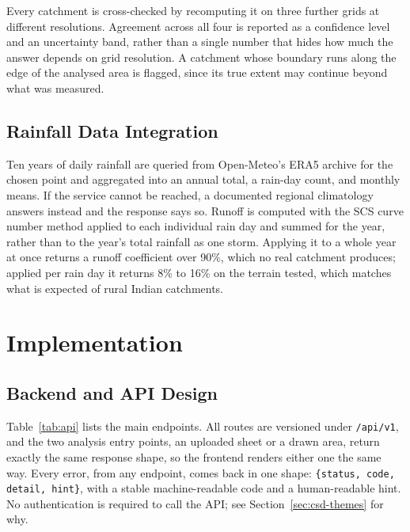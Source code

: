 \documentclass[manuscript,screen,review]{acmart}
\begin{document}
Every catchment is cross-checked by recomputing it on three further grids at different
resolutions. Agreement across all four is reported as a confidence level and an
uncertainty band, rather than a single number that hides how much the answer depends on
grid resolution. A catchment whose boundary runs along the edge of the analysed area is
flagged, since its true extent may continue beyond what was measured.

\subsection{Rainfall Data Integration}
Ten years of daily rainfall are queried from Open-Meteo's ERA5 archive for the chosen
point and aggregated into an annual total, a rain-day count, and monthly means. If the
service cannot be reached, a documented regional climatology answers instead and the
response says so. Runoff is computed with the SCS curve number method applied to each
individual rain day and summed for the year, rather than to the year's total rainfall
as one storm. Applying it to a whole year at once returns a runoff coefficient over
90\%, which no real catchment produces; applied per rain day it returns 8\% to 16\% on
the terrain tested, which matches what is expected of rural Indian catchments.

\section{Implementation}
\label{sec:implementation}

\subsection{Backend and API Design}
Table~\ref{tab:api} lists the main endpoints. All routes are versioned under
\texttt{/api/v1}, and the two analysis entry points, an uploaded sheet or a drawn area,
return exactly the same response shape, so the frontend renders either one the same
way. Every error, from any endpoint, comes back in one shape:
\texttt{\{status, code, detail, hint\}}, with a stable machine-readable code and a
human-readable hint. No authentication is required to call the API; see
Section~\ref{sec:csd-themes} for why.
\end{document}

